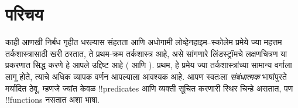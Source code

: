 \documentclass[../../../include/open-logic-section]{subfiles}
\begin{document}
\section{परिचय}

काही आणखी निर्बंध गृहीत धरल्यास संहतता आणि अधोगामी
लोव्हेनहाइम--स्कोलेम प्रमेये ज्या महत्तम तर्कशास्त्रासाठी खरी ठरतात, ते
प्रथम-क्रम तर्कशास्त्र आहे, असे सांगणारे लिंडस्ट्रॉमचे लक्षणचित्रण या
प्रकरणात सिद्ध करणे हे आपले उद्दिष्ट आहे
( आणि
). प्रथम, हे प्रमेय ज्या
तर्कशास्त्रांच्या सामान्य वर्गाला लागू होते, त्याचे अधिक व्यापक वर्णन
आपल्याला आवश्यक आहे. आपण स्वतःला \emph{संबंधात्मक} भाषांपुरते मर्यादित
ठेवू, म्हणजे ज्यांत केवळ !!{predicate}s आणि व्यक्ती सूचित करणारी स्थिर
चिन्हे असतात, पण !!{function}s नसतात अशा भाषा.
\end{document}

